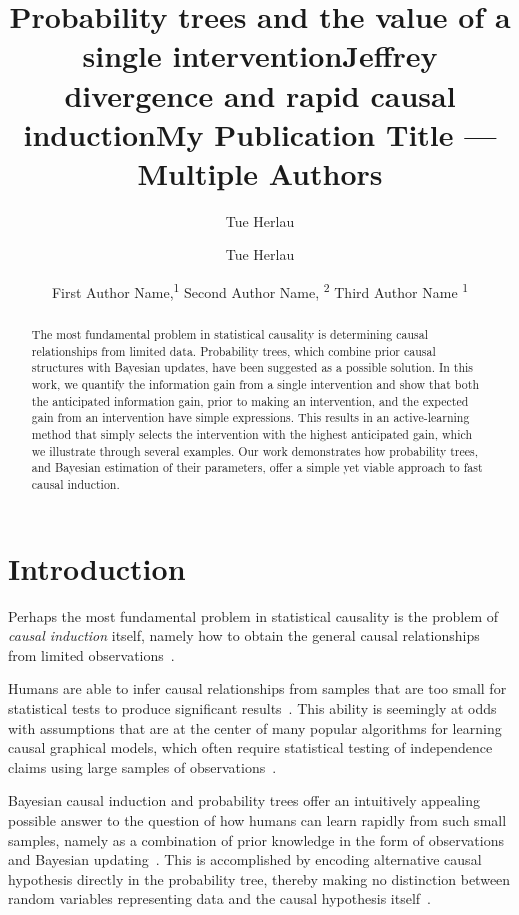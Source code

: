 \documentclass[letterpaper]{article} %
\title{Probability trees and the value of a single intervention}
\author {
Tue Herlau%
}
\title{Jeffrey divergence and rapid causal induction}
\author {
Tue Herlau
}
\title{My Publication Title --- Multiple Authors}
\author {
First Author Name,\textsuperscript{\rm 1}
Second Author Name, \textsuperscript{\rm 2}
Third Author Name \textsuperscript{\rm 1}
}
\begin{document}
\maketitle



\begin{abstract}
The most fundamental problem in statistical causality is determining causal relationships from limited data. Probability trees, which combine prior causal structures with Bayesian updates,
have been suggested as a possible solution.
In this work, we quantify the information gain from a single intervention and show that both the anticipated information gain, prior to making an intervention, and the expected gain from an intervention have simple expressions. This results in an active-learning method that simply selects the intervention with the highest anticipated gain, which we illustrate through several examples. Our work demonstrates how probability trees, and Bayesian estimation of their parameters, offer a simple yet viable approach to fast causal induction.
\end{abstract}

\noindent
\section{Introduction}

Perhaps the most fundamental problem in statistical causality is the problem of \emph{causal induction} itself, namely how to obtain the general causal relationships from limited observations~\citep{griffiths2007mere}.


Humans are able to infer causal relationships from samples that are too small for statistical tests to produce significant results~\cite{gopnik2001causal}. This ability is seemingly at odds with assumptions that are at the center of many popular algorithms for learning causal graphical models, which often require statistical testing of independence claims using large samples of observations~\cite{spirtes2000causation,pearl2000models,janzing2012information}. %








Bayesian causal induction and probability trees offer an intuitively appealing possible answer to the question of how humans can learn rapidly from such small samples, namely as a combination of prior knowledge in the form of observations and Bayesian updating~\cite{griffiths2009theory,ortega2015subjectivity}. This is accomplished by encoding alternative causal hypothesis directly in the probability tree, thereby making no distinction between random variables representing data and the causal hypothesis itself~\cite{genewein2020algorithms,shafer1996art}. %
\end{document}
